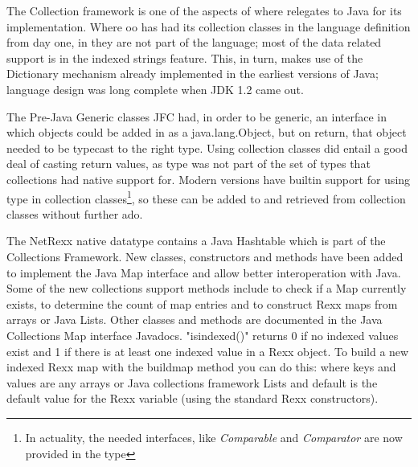 {The Collection framework is one of the aspects of where \nr{}
relegates to Java for its implementation. Where oo\Rexx{} has had its
collection classes in the language definition from day one, in \nr{}
they are not part of the language; most of the data related support is
in the indexed strings feature. This, in turn, makes use of the
Dictionary mechanism already implemented in the earliest versions of Java;
\nr{} language design was long complete when JDK 1.2 came out.

The Pre-Java Generic classes JFC had, in order to be generic, an
interface in which objects could be added in as a java.lang.Object,
but on return, that object needed to be typecast to the right type.
Using collection classes did entail a good deal of casting return
values, as type \Rexx{} was not part of the set of types that
collections had native support for. Modern \nr{} versions
 have builtin support for using type
\Rexx{} in collection classes\footnote{In actuality, the needed
  interfaces, like \emph{Comparable} and \emph{Comparator} are now
  provided in the \Rexx{} type}, so these can be added to and
retrieved from collection classes without further ado. 

The NetRexx native \Rexx{} datatype contains a Java Hashtable which is
part of the Collections Framework. New classes, constructors and
methods have been added to implement the Java Map interface and allow
better interoperation with Java. Some of the new collections support
methods include  to check if a Map currently exists,
 to determine the count of map entries and
 to construct Rexx maps from arrays or
Java Lists. Other classes and methods are documented in the Java
Collections Map interface Javadocs. "isindexed()" returns 0 if no
indexed values exist and 1 if there is at least one indexed value in a
Rexx object. To build a new indexed Rexx map with the buildmap method
you can do this:  where
keys and values are any arrays or Java collections framework Lists and
default is the default value for the Rexx variable (using the standard
Rexx constructors). 

}
